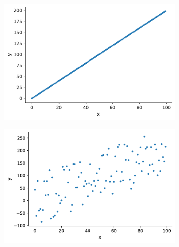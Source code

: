 \documentclass[twoside,12pt]{report}  %
\begin{document}
\begin{figure}[H]
	\centering
	
	\begin{subfigure}[b]{0.25\textwidth}
		\includegraphics[width=\textwidth]{./images/scatterplot_strong_positive_example.pdf}
		\label{scatterplot_example_strong_positive}
	\end{subfigure}
	\begin{subfigure}[b]{0.25\textwidth}
		\includegraphics[width=\textwidth]{./images/scatterplot_weak_positive_example.pdf}
		\label{scatterplot_example_weak_positive}
	\end{subfigure}
	

\end{figure}
\end{document}
